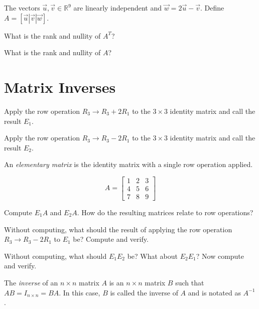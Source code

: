 \documentclass{problemset}
\newcommand{\R}{\mathbb{R}}
\newcommand{\mat}[1]{\begin{bmatrix}#1\end{bmatrix}}
\begin{document}
	\question
	The vectors $\vec u,\vec v\in\R^9$ are linearly independent and $\vec w=2\vec u-\vec v$.
	Define $A=[\vec u|\vec v|\vec w]$.
	\begin{parts}
		\item What is the rank and nullity of $A^T$?
		\item What is the rank and nullity of $A$?
	\end{parts}

\newpage

\section*{Matrix Inverses}

	\question
	\begin{parts}
		\item Apply the row operation $R_3\to R_3+2R_1$ to the $3\times 3$ identity
		matrix and call the result $E_1$.
		\item Apply the row operation $R_3\to R_3-2R_1$ to the $3\times 3$ identity
		matrix and call the result $E_2$.
	\end{parts}

	\begin{definition}
	An \emph{elementary matrix} is the identity matrix with a single row operation applied.
	\end{definition}

	\[
		A=\mat{1&2&3\\4&5&6\\7&8&9}
	\]
	\begin{parts}[resume]
		\item Compute $E_1A$ and $E_2A$.  How do the resulting matrices relate to row
		operations?
		\item Without computing, what should the result of applying the row
		operation $R_3\to R_3-2R_1$ to $E_1$ be?  Compute and verify.
		\item Without computing, what should $E_1E_2$ be?  What about $E_2E_1$?
		Now compute and verify.
	\end{parts}

	\begin{definition}
		The \emph{inverse} of an $n\times n$ matrix $A$ is an $n\times n$
		matrix $B$ such that $AB=I_{n\times n}=BA$.
		In this case, $B$ is called the inverse of $A$ and is notated as $A^{-1}$.
	\end{definition}
\end{document}
